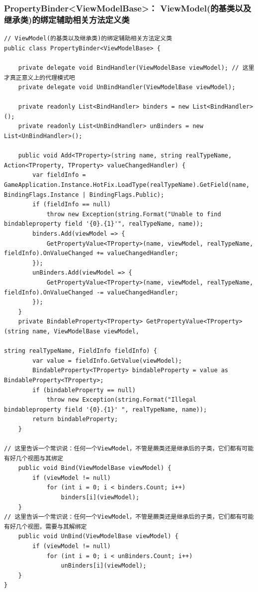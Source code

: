 \documentclass[9pt, b5paper]{article}
\begin{document}
\subsubsection{PropertyBinder<ViewModelBase>： ViewModel(的基类以及继承类)的绑定辅助相关方法定义类}
\label{sec-6-1-3}
\begin{verbatim}
// ViewModel(的基类以及继承类)的绑定辅助相关方法定义类
public class PropertyBinder<ViewModelBase> { 

    private delegate void BindHandler(ViewModelBase viewModel); // 这里才真正意义上的代理模式吧
    private delegate void UnBindHandler(ViewModelBase viewModel);

    private readonly List<BindHandler> binders = new List<BindHandler>();
    private readonly List<UnBindHandler> unBinders = new List<UnBindHandler>();

    public void Add<TProperty>(string name, string realTypeName, Action<TProperty, TProperty> valueChangedHandler) {
        var fieldInfo = GameApplication.Instance.HotFix.LoadType(realTypeName).GetField(name, BindingFlags.Instance | BindingFlags.Public);
        if (fieldInfo == null) 
            throw new Exception(string.Format("Unable to find bindableproperty field '{0}.{1}'", realTypeName, name));
        binders.Add(viewModel => {
            GetPropertyValue<TProperty>(name, viewModel, realTypeName, fieldInfo).OnValueChanged += valueChangedHandler;
        });
        unBinders.Add(viewModel => {
            GetPropertyValue<TProperty>(name, viewModel, realTypeName, fieldInfo).OnValueChanged -= valueChangedHandler;
        });
    }
    private BindableProperty<TProperty> GetPropertyValue<TProperty>(string name, ViewModelBase viewModel,
                                                                    string realTypeName, FieldInfo fieldInfo) {
        var value = fieldInfo.GetValue(viewModel);
        BindableProperty<TProperty> bindableProperty = value as BindableProperty<TProperty>;
        if (bindableProperty == null) 
            throw new Exception(string.Format("Illegal bindableproperty field '{0}.{1}' ", realTypeName, name));
        return bindableProperty;
    }

// 这里告诉一个常识说：任何一个ViewModel，不管是蕨类还是继承后的子类，它们都有可能有好几个视图与其绑定
    public void Bind(ViewModelBase viewModel) {
        if (viewModel != null) 
            for (int i = 0; i < binders.Count; i++) 
                binders[i](viewModel);
    }
// 这里告诉一个常识说：任何一个ViewModel，不管是蕨类还是继承后的子类，它们都有可能有好几个视图，需要与其解绑定
    public void UnBind(ViewModelBase viewModel) {
        if (viewModel != null) 
            for (int i = 0; i < unBinders.Count; i++) 
                unBinders[i](viewModel);
    }
}
\end{verbatim}
\end{document}
